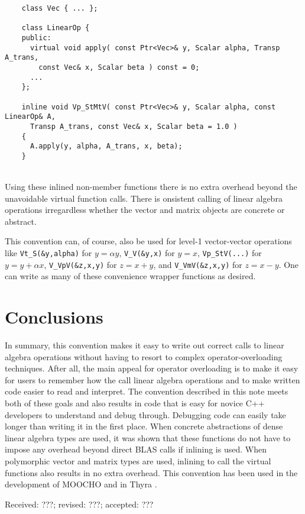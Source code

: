 \documentclass[acmtoms,acmnow]{acmtrans2m}
\begin{document}
{\bsinglespace\small
\begin{minipage}{\textwidth}
\begin{verbatim}
    class Vec { ... };

    class LinearOp {
    public:
      virtual void apply( const Ptr<Vec>& y, Scalar alpha, Transp A_trans,
        const Vec& x, Scalar beta ) const = 0;
      ...
    };

    inline void Vp_StMtV( const Ptr<Vec>& y, Scalar alpha, const LinearOp& A,
      Transp A_trans, const Vec& x, Scalar beta = 1.0 )
    {
      A.apply(y, alpha, A_trans, x, beta);
    }
\end{verbatim}
\end{minipage}
\esinglespace}\\[1ex]

Using these inlined non-member functions there is no extra overhead
beyond the unavoidable virtual function calls.  There is onsistent
calling of linear algebra operations irregardless whether the vector
and matrix objects are concrete or abstract.

This convention can, of course, also be used for level-1 vector-vector
operations like {}\texttt{Vt\_S(\&y,alpha)} for $y = \alpha y$,
{}\texttt{V\_V(\&y,x)} for $y = x$, {}\texttt{Vp\_StV(...)} for $y = y +
\alpha x$, {}\texttt{V\_VpV(\&z,x,y)} for $z = x + y$, and
{}\texttt{V\_VmV(\&z,x,y)} for $z = x - y$.  One can write as many of these
convenience wrapper functions as desired.

\section{Conclusions}

In summary, this convention makes it easy to write out correct calls to linear
algebra operations without having to resort to complex operator-overloading
techniques.  After all, the main appeal for operator overloading is to make it
easy for users to remember how the call linear algebra operations and to make
written code easier to read and interpret.  The convention described in this
note meets both of these goals and also results in code that is easy for
novice C++ developers to understand and debug through.  Debugging code can
easily take longer than writing it in the first place.  When concrete
abstractions of dense linear algebra types are used, it was shown that these
functions do not have to impose any overhead beyond direct BLAS calls if
inlining is used.  When polymorphic vector and matrix types are used, inlining
to call the virtual functions also results in no extra overhead.  This
convention has been used in the development of MOOCHO {}\cite{ref:moocho} and
in Thyra {}\cite{ref:thyra}.

{\bsinglespace

\nopagebreak
\scriptsize

\esinglespace}

\begin{received}
Received: ???; revised: ???; accepted: ???
\end{received}
\end{document}
